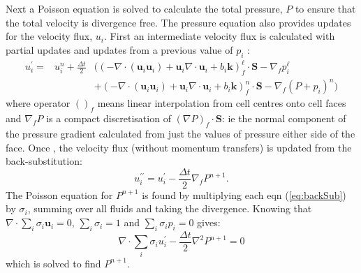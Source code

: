 \documentclass[draft]{agujournal2019}
\begin{document}
Next a Poisson equation is solved to calculate the total pressure,
$P$ to ensure that the total velocity is divergence free.  The pressure
equation also provides updates for the velocity flux, $u_{i}$. First
an intermediate velocity flux is calculated with partial updates and
updates from a previous value of $p_{i}$ :
\begin{eqnarray}
u_{i}^{\prime}= & u_{i}^{n}+\frac{\Delta t}{2} & \biggl(\left(-\nabla\cdot(\mathbf{u}_{i}\mathbf{u}_{i})+\mathbf{u}_{i}\nabla\cdot\mathbf{u}_{i}+b_{i}\mathbf{k}\right)_{f}^{\ell}\cdot\mathbf{S}-\nabla_{f}p_{i}^{\ell}\\
 &  & +\left(-\nabla\cdot(\mathbf{u}_{i}\mathbf{u}_{i})+\mathbf{u}_{i}\nabla\cdot\mathbf{u}_{i}+b_{i}\mathbf{k}\right)_{f}^{n}\cdot\mathbf{S}-\nabla_{f}(P+p_{i})^{n}\biggr)
\end{eqnarray}
where operator $()_{f}$ means linear interpolation from cell centres
onto cell faces and $\nabla_{f}P$ is a compact discretisation of
$(\nabla P)_{f}\cdot\mathbf{S}$: ie the normal component of the pressure
gradient calculated from just the values of pressure either side of
the face. Once , the velocity flux (without
momentum transfers) is updated from the back-substitution:
\begin{equation}
u_{i}^{\prime\prime}=u_{i}^{\prime}-\frac{\Delta t}{2}\nabla_{f}P^{n+1}.\label{eq:backSub}
\end{equation}
The Poisson equation for $P^{n+1}$ is found by multiplying each eqn
(\ref{eq:backSub}) by $\sigma_{i}$, summing over all fluids and
taking the divergence. Knowing that $\nabla\cdot\sum_{i}\sigma_{i}\mathbf{u}_{i}=0$,
$\sum_{i}\sigma_{i}=1$ and $\sum_{i}\sigma_{i}p_{i}=0$ gives:
\begin{equation}
\nabla\cdot\sum_{i}\sigma_{i}u_{i}^{\prime}-\frac{\Delta t}{2}\nabla^{2}P^{n+1}=0
\end{equation}
which is solved to find $P^{n+1}$. 
\end{document}
